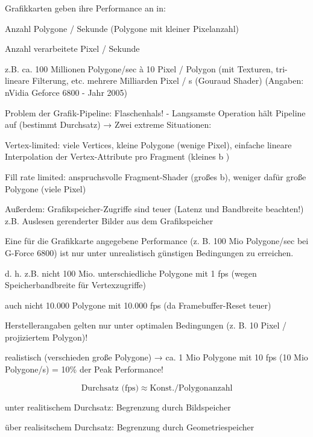 \documentclass[landscape]{article}
\begin{document}
\begin{multicols}{3}
  \begin{itemize*}
    \item Grafikkarten geben ihre Performance an in:
    \begin{itemize*}
      \item  Anzahl Polygone / Sekunde (Polygone mit kleiner Pixelanzahl)
      \item Anzahl verarbeitete Pixel / Sekunde
      \item  z.B. ca. 100 Millionen Polygone/sec à 10 Pixel / Polygon (mit Texturen, tri-lineare Filterung, etc. mehrere Milliarden Pixel / s (Gouraud Shader) (Angaben: nVidia Geforce 6800 - Jahr 2005)
    \end{itemize*}
    \item Problem der Grafik-Pipeline: Flaschenhals! - Langsamste Operation hält Pipeline auf (bestimmt Durchsatz) → Zwei extreme Situationen:
    \begin{itemize*}
      \item  Vertex-limited: viele Vertices, kleine Polygone (wenige Pixel), einfache lineare Interpolation der Vertex-Attribute pro Fragment (kleines b )
      \item  Fill rate limited: anspruchsvolle Fragment-Shader (großes b), weniger dafür große Polygone (viele Pixel)
    \end{itemize*}
    \item Außerdem: Grafikspeicher-Zugriffe sind teuer (Latenz und Bandbreite beachten!) z.B. Auslesen gerenderter Bilder aus dem Grafikspeicher
    \item Eine für die Grafikkarte angegebene Performance (z. B. 100 Mio Polygone/sec bei G-Force 6800) ist nur unter unrealistisch günstigen Bedingungen zu erreichen.
    \begin{itemize*}
      \item  d. h. z.B. nicht 100 Mio. unterschiedliche Polygone mit 1 fps (wegen Speicherbandbreite für Vertexzugriffe)
      \item  auch nicht 10.000 Polygone mit 10.000 fps (da Framebuffer-Reset teuer)
      \item  Herstellerangaben gelten nur unter optimalen Bedingungen (z. B. 10 Pixel / projiziertem Polygon)!
      \item  realistisch (verschieden große Polygone) → ca. 1 Mio Polygone mit 10 fps (10 Mio Polygone/s) = 10\% der Peak Performance!
    \end{itemize*}
  \end{itemize*}
  
  $$\text{Durchsatz (fps)} \approx \text{Konst.} / \text{Polygonanzahl}$$
  \begin{itemize*}
    \item unter realitischem Durchsatz: Begrenzung durch Bildspeicher
    \item über realisitschem Durchsatz: Begrenzung durch Geometriespeicher
  \end{itemize*}
  

\end{multicols}
\end{document}
